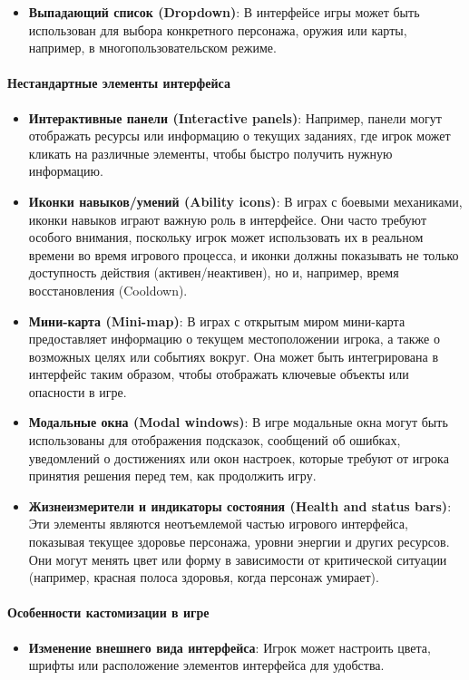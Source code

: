 \documentclass{article}
\begin{document}
\begin{itemize}
\begin{itemize}
    \item \textbf{Выпадающий список (Dropdown)}: В интерфейсе игры может быть использован для выбора конкретного персонажа, оружия или карты, например, в многопользовательском режиме.
\end{itemize}

\paragraph{Нестандартные элементы интерфейса}
\begin{itemize}
    \item \textbf{Интерактивные панели (Interactive panels)}: Например, панели могут отображать ресурсы или информацию о текущих заданиях, где игрок может кликать на различные элементы, чтобы быстро получить нужную информацию.
    
    \item \textbf{Иконки навыков/умений (Ability icons)}: В играх с боевыми механиками, иконки навыков играют важную роль в интерфейсе. Они часто требуют особого внимания, поскольку игрок может использовать их в реальном времени во время игрового процесса, и иконки должны показывать не только доступность действия (активен/неактивен), но и, например, время восстановления (Cooldown).
    
    \item \textbf{Мини-карта (Mini-map)}: В играх с открытым миром мини-карта предоставляет информацию о текущем местоположении игрока, а также о возможных целях или событиях вокруг. Она может быть интегрирована в интерфейс таким образом, чтобы отображать ключевые объекты или опасности в игре.
    
    \item \textbf{Модальные окна (Modal windows)}: В игре модальные окна могут быть использованы для отображения подсказок, сообщений об ошибках, уведомлений о достижениях или окон настроек, которые требуют от игрока принятия решения перед тем, как продолжить игру.
    
    \item \textbf{Жизнеизмерители и индикаторы состояния (Health and status bars)}: Эти элементы являются неотъемлемой частью игрового интерфейса, показывая текущее здоровье персонажа, уровни энергии и других ресурсов. Они могут менять цвет или форму в зависимости от критической ситуации (например, красная полоса здоровья, когда персонаж умирает).
\end{itemize}

\paragraph{Особенности кастомизации в игре}
\begin{itemize}
    \item \textbf{Изменение внешнего вида интерфейса}: Игрок может настроить цвета, шрифты или расположение элементов интерфейса для удобства.
    

\end{itemize}
\end{itemize}
\end{document}
